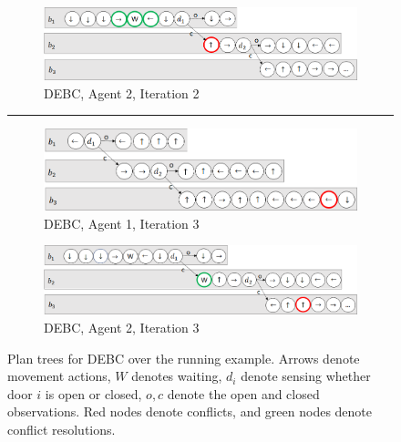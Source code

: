 \documentclass[letterpaper]{article} %
\begin{document}
\begin{figure}[t]
    \begin{subfigure}[b]{0.4\textwidth}
      \includegraphics[scale=.25]{Figures/DEBC2.2.png}
      \caption{DEBC, Agent 2, Iteration 2}
      \label{fig:DEBC2.2}
    \end{subfigure}   
    \hrule\vspace{5pt}\par
    \begin{subfigure}[b]{0.4\textwidth}
      \includegraphics[scale=.25]{Figures/DEBC1.3.png}
      \caption{DEBC, Agent 1, Iteration 3}
      \label{fig:DEBC1.3}
    \end{subfigure}
    \begin{subfigure}[b]{0.4\textwidth}
      \includegraphics[scale=.25]{Figures/DEBC2.3.png}
      \caption{DEBC, Agent 2, Iteration 3}
      \label{fig:DEBC2.3}
    \end{subfigure}
    \caption{Plan trees for DEBC over the running example. Arrows denote movement actions, $W$ denotes waiting, $d_i$ denote sensing whether door $i$ is open or closed, $o,c$ denote the open and closed observations. Red nodes denote conflicts, and green nodes denote conflict resolutions.}
    \label{fig:DEBC}
\end{figure}
\end{document}
